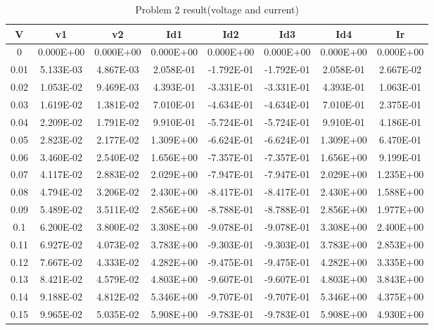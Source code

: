 \documentclass{article}
\begin{document}
\begin{center}
    \begin{longtable}{|c|c|c|c|c|c|c|c|}
        \caption{Problem 2 result(voltage and current)} \label{tab:problem 2 volt} \\
    \hline
    V & v1 & v2 & Id1 & Id2 & Id3 & Id4 & Ir \\ \hline
    0 & 0.000E+00 & 0.000E+00 & 0.000E+00 & 0.000E+00 & 0.000E+00 & 0.000E+00 & 0.000E+00 \\ \hline
    0.01 & 5.133E-03 & 4.867E-03 & 2.058E-01 & -1.792E-01 & -1.792E-01 & 2.058E-01 & 2.667E-02 \\ \hline
    0.02 & 1.053E-02 & 9.469E-03 & 4.393E-01 & -3.331E-01 & -3.331E-01 & 4.393E-01 & 1.063E-01 \\ \hline
    0.03 & 1.619E-02 & 1.381E-02 & 7.010E-01 & -4.634E-01 & -4.634E-01 & 7.010E-01 & 2.375E-01 \\ \hline
    0.04 & 2.209E-02 & 1.791E-02 & 9.910E-01 & -5.724E-01 & -5.724E-01 & 9.910E-01 & 4.186E-01 \\ \hline
    0.05 & 2.823E-02 & 2.177E-02 & 1.309E+00 & -6.624E-01 & -6.624E-01 & 1.309E+00 & 6.470E-01 \\ \hline
    0.06 & 3.460E-02 & 2.540E-02 & 1.656E+00 & -7.357E-01 & -7.357E-01 & 1.656E+00 & 9.199E-01 \\ \hline
    0.07 & 4.117E-02 & 2.883E-02 & 2.029E+00 & -7.947E-01 & -7.947E-01 & 2.029E+00 & 1.235E+00 \\ \hline
    0.08 & 4.794E-02 & 3.206E-02 & 2.430E+00 & -8.417E-01 & -8.417E-01 & 2.430E+00 & 1.588E+00 \\ \hline
    0.09 & 5.489E-02 & 3.511E-02 & 2.856E+00 & -8.788E-01 & -8.788E-01 & 2.856E+00 & 1.977E+00 \\ \hline
    0.1 & 6.200E-02 & 3.800E-02 & 3.308E+00 & -9.078E-01 & -9.078E-01 & 3.308E+00 & 2.400E+00 \\ \hline
    0.11 & 6.927E-02 & 4.073E-02 & 3.783E+00 & -9.303E-01 & -9.303E-01 & 3.783E+00 & 2.853E+00 \\ \hline
    0.12 & 7.667E-02 & 4.333E-02 & 4.282E+00 & -9.475E-01 & -9.475E-01 & 4.282E+00 & 3.335E+00 \\ \hline
    0.13 & 8.421E-02 & 4.579E-02 & 4.803E+00 & -9.607E-01 & -9.607E-01 & 4.803E+00 & 3.843E+00 \\ \hline
    0.14 & 9.188E-02 & 4.812E-02 & 5.346E+00 & -9.707E-01 & -9.707E-01 & 5.346E+00 & 4.375E+00 \\ \hline
    0.15 & 9.965E-02 & 5.035E-02 & 5.908E+00 & -9.783E-01 & -9.783E-01 & 5.908E+00 & 4.930E+00 \\ \hline

\end{longtable}
\end{center}
\end{document}
